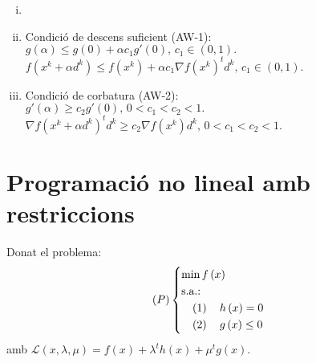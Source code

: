 \begin{prop}
    \begin{enumerate}[i)]
        \item[]
        \item Condici\'o de descens suficient (AW-1): \\
            $g\left( \alpha \right) \leq g\left( 0 \right) + \alpha c_1g'\left( 0 \right),\, c_1 \in (0,1).$ \\
            $f\left( x^k + \alpha d^k \right) \leq f\left( x^k \right) + \alpha c_1 \nabla f\left( x^k \right)^t d^k,\, c_1 \in (0,1).$
        \item Condici\'o de corbatura (AW-2): \\
            $g'\left( \alpha \right) \geq c_2 g'\left( 0 \right),\, 0 < c_1 < c_2 < 1.$ \\
            $\nabla f\left( x^k + \alpha d^k \right)^td^k \geq c_2 \nabla f\left( x^k \right)d^k,\, 0 < c_1 < c_2 < 1$.
    \end{enumerate}
\end{prop}

\section{Programaci\'o no lineal amb restriccions}

Donat el problema:
\begin{equation*}
    \lp P \rp \begin{dcases*}
        \min f \left( x \right) \\
        \text{s.a.: } \\
        \quad \left( 1 \right) \quad h \left( x \right) = 0 \\
        \quad \left( 2 \right) \quad g \left( x \right) \leq 0 \\
    \end{dcases*}
\end{equation*}
amb $\mathcal{L} \left( x, \lambda, \mu \right) = f\left( x \right) + \lambda^t h\left( x \right) + \mu^t g\left( x \right)$.

